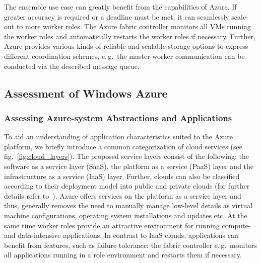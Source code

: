 \documentclass[3p,twocolumn]{elsarticle}
\begin{document}

The ensemble use case can greatly benefit from the
capabilities of Azure. If greater accuracy is required or a deadline
must be met, it can seamlessly scale-out to more worker roles.  The
Azure fabric controller monitors all VMs running the worker roles and
automatically restarts the worker roles if necessary. Further, Azure
provides various kinds of reliable and scalable storage options to
express different coordination schemes, e.\,g.\ the master-worker
communication can be conducted via the described message queue. 



\subsection{Assessment of Windows Azure}
\upp
\subsubsection{Assessing Azure-system Abstractions and Applications}

To aid an understanding of application characteristics suited to the
Azure platform, we briefly introduce a common categorization of cloud
services (see fig.~\ref{fig:cloud_layers}). The proposed service
layers consist of the following: the software as a service layer
(SaaS), the platform as a service (PaaS) layer and the infrastructure
as a service (IaaS) layer. Further, clouds can also be classified
according to their deployment model into public and private clouds
(for further details refer to~\cite{Jha:2010kx}).  Azure offers
services on the platform as a service layer and thus, generally
removes the need to manually manage low-level details as virtual
machine configurations, operating system installations and updates
etc.  At the same time worker roles provide an attractive environment
for running compute- and data-intensive applications. In contrast to
IaaS clouds, applications can benefit from features, such as failure
tolerance: the fabric controller e.\,g.\ monitors all applications
running in a role environment and restarts them if necessary.
\end{document}
